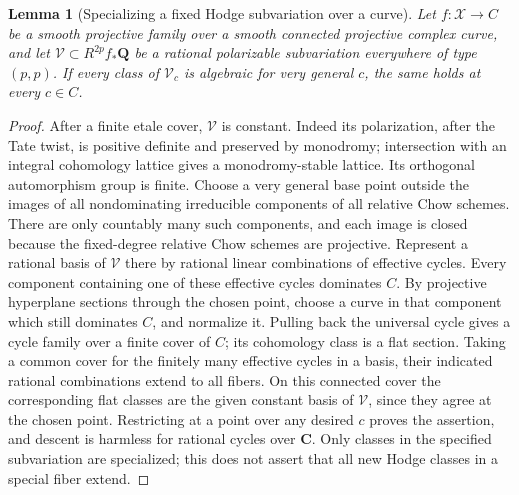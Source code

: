 \documentclass[11pt,reqno]{article}
\theoremstyle{emphasizedplain}
\newtheorem{lemma}[theorem]{Lemma}
\theoremstyle{emphasizeddefinition}
\theoremstyle{emphasizeddefinition}
\newcommand{\Q}{\mathbf Q}
\newcommand{\C}{\mathbf C}
\begin{document}
\begin{lemma}[Specializing a fixed Hodge subvariation over a curve]
\label{p:curve-specialization}
Let $f:\mathcal X\to C$ be a smooth projective family over a smooth
connected projective complex curve, and let $\mathcal V\subset R^{2p}f_*\Q$
be a rational polarizable subvariation everywhere of type $(p,p)$.
If every class of $\mathcal V_c$ is algebraic for very general $c$,
the same holds at every $c\in C$.
\end{lemma}
\begin{proof}
After a finite etale cover, $\mathcal V$ is constant. Indeed its
polarization, after the Tate twist, is positive definite and preserved
by monodromy; intersection with an integral cohomology lattice gives
a monodromy-stable lattice. Its orthogonal automorphism group is finite.
Choose a very general base point outside the images of all
nondominating irreducible components of all relative Chow schemes.
There are only countably many such components, and each image is
closed because the fixed-degree relative Chow schemes are projective.
Represent a rational basis of $\mathcal V$ there by rational linear
combinations of effective cycles. Every component containing one of
these effective cycles dominates $C$. By projective hyperplane sections
through the chosen point, choose a curve in that component which still
dominates $C$, and normalize it. Pulling back the universal cycle gives
a cycle family over a finite cover of $C$; its cohomology class is a
flat section. Taking a common cover for the finitely many effective
cycles in a basis, their indicated rational combinations extend to
all fibers. On this connected cover the corresponding flat classes
are the given constant basis of $\mathcal V$, since they agree at the
chosen point. Restricting at a point over any desired $c$ proves the
assertion, and descent is harmless for rational cycles over $\C$.
Only classes in the specified subvariation are specialized; this does
not assert that all new Hodge classes in a special fiber extend.
\end{proof}
\end{document}
